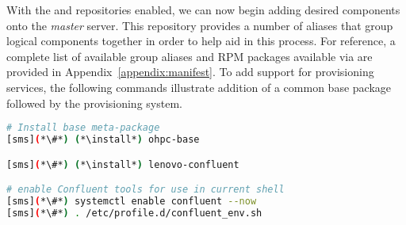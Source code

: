 
With the \OHPC{} and \Confluent{} repositories enabled, we can now begin adding desired components onto the {\em master}
server. This repository provides a number of aliases that group logical components together in order to help aid in this
process. For reference, a complete list of available group aliases and RPM packages available via \OHPC{} are provided
in Appendix~\ref{appendix:manifest}. To add support for provisioning services, the following commands illustrate
addition of a common base package followed by the \Confluent{} provisioning system.

\begin{lstlisting}[language=bash,keywords={}]
# Install base meta-package
[sms](*\#*) (*\install*) ohpc-base

[sms](*\#*) (*\install*) lenovo-confluent

# enable Confluent tools for use in current shell
[sms](*\#*) systemctl enable confluent --now
[sms](*\#*) . /etc/profile.d/confluent_env.sh
\end{lstlisting}
